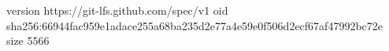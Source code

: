 version https://git-lfs.github.com/spec/v1
oid sha256:66944fac959e1adace255a68ba235d2e77a4e59e0f506d2ecf67af47992bc72e
size 5566
